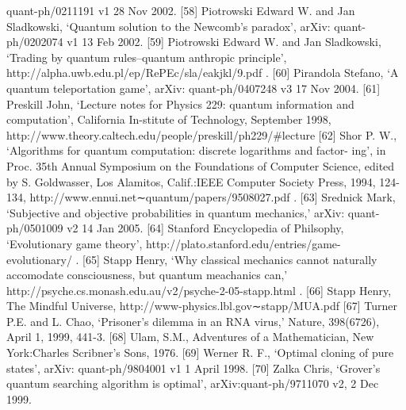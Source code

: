 \begin{verbatim*}
quant-ph/0211191 v1 28 Nov 2002.
[58] Piotrowski Edward W. and Jan Sladkowski, ‘Quantum solution to the Newcomb’s paradox’, arXiv:
quant-ph/0202074 v1 13 Feb 2002.
[59] Piotrowski Edward W. and Jan Sladkowski, ‘Trading by quantum rules–quantum anthropic principle’,
http://alpha.uwb.edu.pl/ep/RePEc/sla/eakjkl/9.pdf .
[60] Pirandola Stefano, ‘A quantum teleportation game’, arXiv: quant-ph/0407248 v3 17 Nov 2004.
[61] Preskill John, ‘Lecture notes for Physics 229: quantum information and computation’, California In-stitute of Technology, September 1998, http://www.theory.caltech.edu/people/preskill/ph229/#lecture
[62] Shor P. W., ‘Algorithms for quantum computation: discrete logarithms and factor- ing’, in Proc. 35th Annual Symposium on the Foundations of Computer Science, edited by S. Goldwasser, Los Alamitos, Calif.:IEEE Computer Society Press, 1994, 124-134,
http://www.ennui.net∼quantum/papers/9508027.pdf .
[63] Srednick Mark, ‘Subjective and objective probabilities in quantum mechanics,’ arXiv:
quant-ph/0501009 v2 14 Jan 2005.
[64] Stanford Encyclopedia of Philsophy, ‘Evolutionary game theory’,
http://plato.stanford.edu/entries/game-evolutionary/ .
[65] Stapp Henry, ‘Why classical mechanics cannot naturally accomodate consciousness, but quantum
meachanics can,’ http://psyche.cs.monash.edu.au/v2/psyche-2-05-stapp.html .
[66] Stapp Henry, The Mindful Universe, http://www-physics.lbl.gov∼stapp/MUA.pdf
[67] Turner P.E. and L. Chao, ‘Prisoner’s dilemma in an RNA virus,’ Nature, 398(6726), April 1, 1999,
441-3.
[68] Ulam, S.M., Adventures of a Mathematician, New York:Charles Scribner’s Sons, 1976.
[69] Werner R. F., ‘Optimal cloning of pure states’, arXiv: quant-ph/9804001 v1 1 April 1998.
[70] Zalka Chris, ‘Grover’s quantum searching algorithm is optimal’, arXiv:quant-ph/9711070 v2, 2 Dec 1999.

\end{verbatim*}
